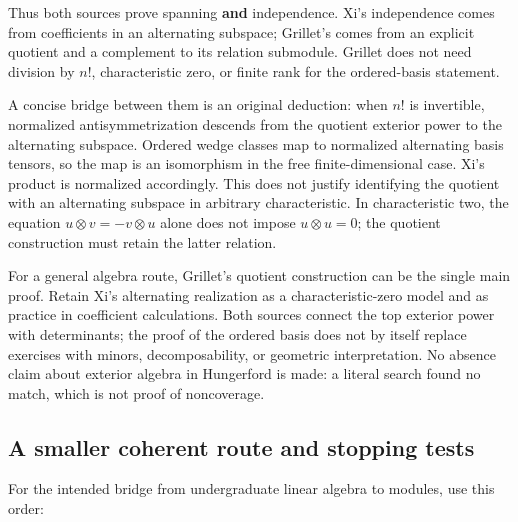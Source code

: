 \documentclass[
  11pt,
]{article}
\begin{document}
Thus both sources prove spanning \textbf{and} independence. Xi's
independence comes from coefficients in an alternating subspace;
Grillet's comes from an explicit quotient and a complement to its
relation submodule. Grillet does not need division by \(n!\),
characteristic zero, or finite rank for the ordered-basis statement.

A concise bridge between them is an original deduction: when \(n!\) is
invertible, normalized antisymmetrization descends from the quotient
exterior power to the alternating subspace. Ordered wedge classes map to
normalized alternating basis tensors, so the map is an isomorphism in
the free finite-dimensional case. Xi's product is normalized
accordingly. This does not justify identifying the quotient with an
alternating subspace in arbitrary characteristic. In characteristic two,
the equation \(u\otimes v=-v\otimes u\) alone does not impose
\(u\otimes u=0\); the quotient construction must retain the latter
relation.

For a general algebra route, Grillet's quotient construction can be the
single main proof. Retain Xi's alternating realization as a
characteristic-zero model and as practice in coefficient calculations.
Both sources connect the top exterior power with determinants; the proof
of the ordered basis does not by itself replace exercises with minors,
decomposability, or geometric interpretation. No absence claim about
exterior algebra in Hungerford is made: a literal search found no match,
which is not proof of noncoverage.

\subsection{A smaller coherent route and stopping
tests}\label{a-smaller-coherent-route-and-stopping-tests}

For the intended bridge from undergraduate linear algebra to modules,
use this order:
\end{document}
